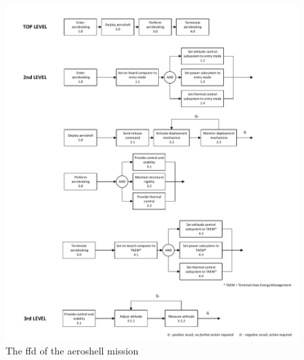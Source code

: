 \begin{figure}[H]
\hspace{-10mm}                           
\includegraphics[width = 1.1\textwidth]{Figure/FFD.pdf}
\caption{The \gls{ffd} of the aeroshell mission}      
\label{fig:ffs}
\end{figure}